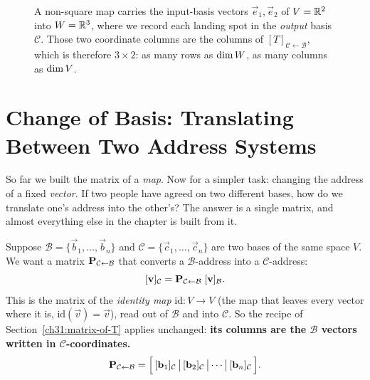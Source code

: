 \begin{figure}[H]
\centering
{}
\caption{A non-square map carries the input-basis vectors $\vec{e}_1,\vec{e}_2$
of $V=\mathbb{R}^2$ into $W=\mathbb{R}^3$, where we record each landing spot in the
\emph{output} basis $\mathcal{C}$. Those two coordinate columns are the columns of
$[T]_{\mathcal{C}\leftarrow\mathcal{B}}$, which is therefore $3\times 2$: as many
rows as $\operatorname{dim} W$, as many columns as $\operatorname{dim} V$.}
\label{ch31:fig-nonsquare}
\end{figure}

\section{Change of Basis: Translating Between Two Address Systems}
\label{ch31:change-of-basis}

So far we built the matrix of a \emph{map}. Now for a simpler task: changing
the address of a fixed \emph{vector}. If two people
have agreed on two different bases, how do we translate one's address into the
other's? The answer is a single matrix, and almost everything else in the chapter
is built from it.

Suppose $\mathcal{B}=\{\vec{b}_1,\dots,\vec{b}_n\}$ and
$\mathcal{C}=\{\vec{c}_1,\dots,\vec{c}_n\}$ are two bases of the same space $V$.
We want a matrix $\mathbf{P}_{\mathcal{C}\leftarrow\mathcal{B}}$ that converts a
$\mathcal{B}$-address into a $\mathcal{C}$-address:
\[
  [\mathbf{v}]_{\mathcal{C}} = \mathbf{P}_{\mathcal{C}\leftarrow\mathcal{B}}\;[\mathbf{v}]_{\mathcal{B}}.
\]
This is the matrix of the \emph{identity map} $\mathrm{id}:V\to V$ (the map
that leaves every vector where it is, $\mathrm{id}(\vec{v})=\vec{v}$), read out of
$\mathcal{B}$ and into $\mathcal{C}$. So the recipe of Section~\ref{ch31:matrix-of-T}
applies unchanged: \textbf{its columns are the $\mathcal{B}$ vectors written in
$\mathcal{C}$-coordinates.}
\[
  \mathbf{P}_{\mathcal{C}\leftarrow\mathcal{B}}
  = \Big[\,[\mathbf{b}_1]_{\mathcal{C}}\,\big|\,[\mathbf{b}_2]_{\mathcal{C}}\,\big|\cdots\big|\,[\mathbf{b}_n]_{\mathcal{C}}\,\Big].
\]


